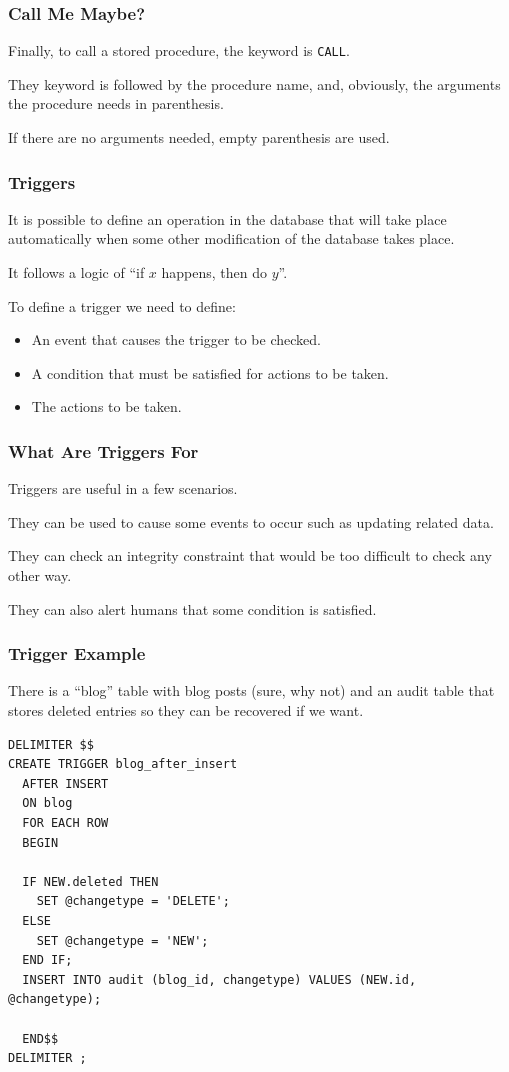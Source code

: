 \begin{frame}
\frametitle{Call Me Maybe?}

Finally, to call a stored procedure, the keyword is \texttt{CALL}.

They keyword is followed by the procedure name, and, obviously, the arguments the procedure needs in parenthesis.

If there are no arguments needed, empty parenthesis are used.

\end{frame}


\begin{frame}
\frametitle{Triggers}

It is possible to define an operation in the database that will take place automatically when some other modification of the database takes place. 

It follows a logic of ``if $x$ happens, then do $y$''. 

To define a trigger we need to define:
\begin{itemize}
	\item An event that causes the trigger to be checked.
	\item A condition that must be satisfied for actions to be taken.
	\item The actions to be taken.
\end{itemize}

\end{frame}

\begin{frame}
\frametitle{What Are Triggers For}

Triggers are useful in a few scenarios. 

They can be used to cause some events to occur such as updating related data.

They can check an integrity constraint that would be too difficult to check any other way. 

They can also alert humans that some condition is satisfied. 

\end{frame}

\begin{frame}[fragile]
\frametitle{Trigger Example}

There is a ``blog'' table with blog posts (sure, why not) and an audit table that stores deleted entries so they can be recovered if we want.

{\small
\begin{verbatim}
DELIMITER $$
CREATE TRIGGER blog_after_insert 
  AFTER INSERT 
  ON blog
  FOR EACH ROW 
  BEGIN
  
  IF NEW.deleted THEN
    SET @changetype = 'DELETE';
  ELSE
    SET @changetype = 'NEW';
  END IF;  
  INSERT INTO audit (blog_id, changetype) VALUES (NEW.id, @changetype);
		
  END$$
DELIMITER ;
\end{verbatim}
}



\end{frame}


